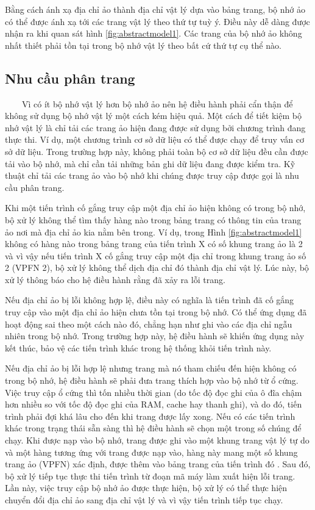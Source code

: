 \documentclass{article}
\begin{document}
Bằng cách ánh xạ địa chỉ ảo thành địa chỉ vật lý dựa vào bảng trang, bộ nhớ ảo có thể được ánh xạ tới các trang vật lý theo thứ tự tuỳ ý. Điều này dễ dàng được nhận ra khi quan sát hình \ref{fig:abstractmodel1}. Các trang của bộ nhớ ảo không nhất thiết phải tồn tại trong bộ nhớ vật lý theo bất cứ thứ tự cụ thể nào.

\subsection{Nhu cầu phân trang}
~~~~Vì có ít bộ nhớ vật lý hơn bộ nhớ ảo nên hệ điều hành phải cẩn thận để không sử dụng bộ nhớ vật lý một cách kém hiệu quả. Một cách để tiết kiệm bộ nhớ vật lý là chỉ tải các trang ảo hiện đang được sử dụng bởi chương trình đang thực thi. Ví dụ, một chương trình cơ sở dữ liệu có thể được chạy để truy vấn cơ sở dữ liệu. Trong trường hợp này, không phải toàn bộ cơ sở dữ liệu đều cần được tải vào bộ nhớ, mà chỉ cần tải những bản ghi dữ liệu đang được kiểm tra. Kỹ thuật chỉ tải các trang ảo vào bộ nhớ khi chúng được truy cập được gọi là nhu cầu phân trang.\vspace{1em}

Khi một tiến trình cố gắng truy cập một địa chỉ ảo hiện không có trong bộ nhớ, bộ xử lý không thể tìm thấy hàng nào trong bảng trang có thông tin của trang ảo nơi mà địa chỉ ảo kia nằm bên trong. Ví dụ, trong Hình \ref{fig:abstractmodel1} không có hàng nào trong bảng trang của tiến trình X có số khung trang ảo là 2 và vì vậy nếu tiến trình X cố gắng truy cập một địa chỉ trong khung trang ảo số 2 (VPFN 2), bộ xử lý không thể dịch địa chỉ đó thành địa chỉ vật lý. Lúc này, bộ xử lý thông báo cho hệ điều hành rằng đã xảy ra lỗi trang.\vspace{1em}

Nếu địa chỉ ảo bị lỗi không hợp lệ, điều này có nghĩa là tiến trình đã cố gắng truy cập vào một địa chỉ ảo hiện chưa tồn tại trong bộ nhớ. Có thể ứng dụng đã hoạt động sai theo một cách nào đó, chẳng hạn như ghi vào các địa chỉ ngẫu nhiên trong bộ nhớ. Trong trường hợp này, hệ điều hành sẽ khiến ứng dụng này kết thúc, bảo vệ các tiến trình khác trong hệ thống khỏi tiến trình này.\vspace{1em}

Nếu địa chỉ ảo bị lỗi hợp lệ nhưng trang mà nó tham chiếu đến hiện không có trong bộ nhớ, hệ điều hành sẽ phải đưa trang thích hợp vào bộ nhớ từ ổ cứng. Việc truy cập ổ cứng thì tốn nhiều thời gian (do tốc độ đọc ghi của ô đĩa chậm hơn nhiều so với tốc độ đọc ghi của RAM, cache hay thanh ghi), và do đó, tiến trình phải đợi khá lâu cho đến khi trang được lấy xong. Nếu có các tiến trình khác trong trạng thái sẵn sàng thì hệ điều hành sẽ chọn một trong số chúng để chạy. Khi được nạp vào bộ nhớ, trang được ghi vào một khung trang vật lý tự do và một hàng tương ứng với trang được nạp vào, hàng này mang một số khung trang ảo (VPFN) xác định, được thêm vào bảng trang của tiến trình đó . Sau đó, bộ xử lý tiếp tục thực thi tiến trình từ đoạn mã máy làm xuất hiện lỗi trang. Lần này, việc truy cập bộ nhớ ảo được thực hiện, bộ xử lý có thể thực hiện chuyển đổi địa chỉ ảo sang địa chỉ vật lý và vì vậy tiến trình tiếp tục chạy.\vspace{1em}
\end{document}
